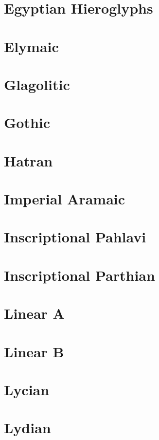 \documentclass{article}
\begin{document}
\section{Egyptian Hieroglyphs}

\section{Elymaic}

\section{Glagolitic}

\section{Gothic}

\section{Hatran}

\section{Imperial Aramaic}

\section{Inscriptional Pahlavi}

\section{Inscriptional Parthian}


\section{Linear A}

\section{Linear B}

\section{Lycian}

\section{Lydian}
\end{document}
